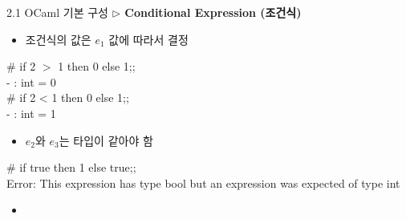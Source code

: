 \documentclass[10pt]{beamer}
\begin{document}
	\begin{frame}{2.1 OCaml 기본 구성}
		\textbf{$\triangleright$ Conditional Expression (조건식)}
		\begin{itemize}
			\item 조건식의 값은 $e_1$ 값에 따라서 결정
		\end{itemize}
		\begin{tcolorbox}[colback=backcolor]\ttfamily
			\# if 2 $>$ 1 then 0 else 1;;\\
			- : int = 0 \\
			\# if 2 < 1 then 0 else 1;; \\
			- : int = 1
		\end{tcolorbox}
		\begin{itemize}
			\item $e_2$와 $e_3$는 타입이 같아야 함
		\end{itemize}
		\begin{tcolorbox}[colback=backcolor]\ttfamily
			\# if true then 1 else true;;\\
			Error: This expression has type bool but an expression was expected of type
			int
		\end{tcolorbox}
		\begin{itemize}
			\item[]
		\end{itemize}
	\end{frame}
\end{document}
